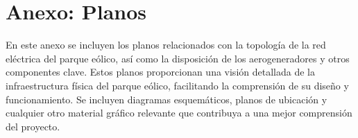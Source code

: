 \chapter{Anexo: Planos}
\label{cap:Planos}

En este anexo se incluyen los planos relacionados con la topología de la red eléctrica del parque eólico, así como la disposición de los aerogeneradores y otros componentes clave. Estos planos proporcionan una visión detallada de la infraestructura física del parque eólico, facilitando la comprensión de su diseño y funcionamiento. Se incluyen diagramas esquemáticos, planos de ubicación y cualquier otro material gráfico relevante que contribuya a una mejor comprensión del proyecto.



